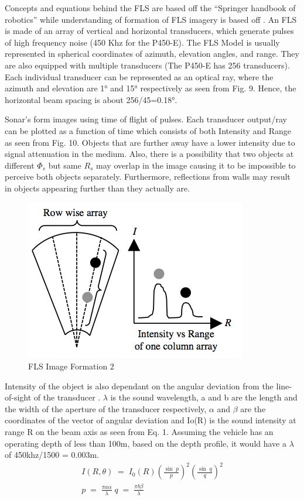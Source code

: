 \documentclass[15pt]{article}
\let\Phi\varPhi
\newcommand{\RSonar}{$\si{\textit{R}_{s}}$\xspace}
\newcommand{\PhiSonar}{$\si{\Phi_{s}}$\xspace}
\begin{document}
Concepts and equations behind the FLS are based off the “Springer handbook of robotics” \cite{handbook-of-robotics} while understanding of formation of FLS imagery is based off \cite{Coiras2009}. An FLS is made of an array of vertical and horizontal transducers, which generate pulses of high frequency noise (450 Khz for the P450-E). The FLS Model is usually represented in spherical coordinates of azimuth, elevation angles, and range. They are also equipped with multiple transducers (The P450-E has 256 transducers). Each individual transducer can be represented as an optical ray, where the azimuth and elevation are 1\si{\degree} and 15\si{\degree} respectively as seen from Fig. 9. Hence, the horizontal beam spacing is about 256/45=0.18\si{\degree}. 

Sonar’s form images using time of flight of pulses. Each transducer output/ray can be plotted as a function of time which consists of both Intensity and Range as seen from Fig. 10. Objects that are further away have a lower intensity due to signal attenuation in the medium. Also, there is a possibility that two objects at different \PhiSonar but same \RSonar may overlap in the image causing it to be impossible to perceive both objects separately. Furthermore, reflections from walls may result in objects appearing further than they actually are.

\begin{figure}[h!]
  \centering
  \includegraphics[scale=0.5]{transducers}
  \captionsetup{justification=centering}
  \caption{FLS Image Formation 2}
\end{figure}

Intensity of the object is also dependant on the angular deviation from the line-of-sight of the transducer \cite{Creuze2005}.  $\lambda$ is the sound wavelength, a and b are the length and the width of the aperture of the transducer respectively, $\alpha$ and $\beta$ are the coordinates of the vector of angular deviation and Io(R) is the sound intensity at range R on the beam axis as seen from Eq. 1. Assuming the vehicle has an operating depth of less than 100m, based on the depth profile, it would have a $\lambda$ of 450khz/1500 = 0.003m.
\begin{gather}
I\left( R,\theta  \right)\; =\; I_{0}\left( R \right)\left( \frac{\sin \; p}{p} \right)^{2}\left( \frac{\sin \; q}{q} \right)^{2} \\
p\; =\; \frac{\pi a\alpha }{\lambda }\; q\; =\; \frac{\pi b\beta }{\lambda }\; 
\end{gather}
 
\end{document}
